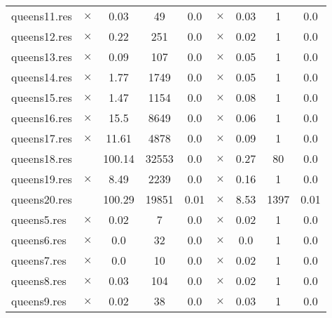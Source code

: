 \documentclass[main.tex]{subfiles}
\begin{document}
\begin{landscape}
\begin{center}
\begin{tabular}{lcccccccc}
queens11.res & $\times$ & 0.03 & 49 & 0.0
 & $\times$ & 0.03 & 1 & 0.0
\\
queens12.res & $\times$ & 0.22 & 251 & 0.0
 & $\times$ & 0.02 & 1 & 0.0
\\
queens13.res & $\times$ & 0.09 & 107 & 0.0
 & $\times$ & 0.05 & 1 & 0.0
\\
queens14.res & $\times$ & 1.77 & 1749 & 0.0
 & $\times$ & 0.05 & 1 & 0.0
\\
queens15.res & $\times$ & 1.47 & 1154 & 0.0
 & $\times$ & 0.08 & 1 & 0.0
\\
queens16.res & $\times$ & 15.5 & 8649 & 0.0
 & $\times$ & 0.06 & 1 & 0.0
\\
queens17.res & $\times$ & 11.61 & 4878 & 0.0
 & $\times$ & 0.09 & 1 & 0.0
\\
queens18.res &  & 100.14 & 32553 & 0.0
 & $\times$ & 0.27 & 80 & 0.0
\\
queens19.res & $\times$ & 8.49 & 2239 & 0.0
 & $\times$ & 0.16 & 1 & 0.0
\\
queens20.res &  & 100.29 & 19851 & 0.01
 & $\times$ & 8.53 & 1397 & 0.01
\\
queens5.res & $\times$ & 0.02 & 7 & 0.0
 & $\times$ & 0.02 & 1 & 0.0
\\
queens6.res & $\times$ & 0.0 & 32 & 0.0
 & $\times$ & 0.0 & 1 & 0.0
\\
queens7.res & $\times$ & 0.0 & 10 & 0.0
 & $\times$ & 0.02 & 1 & 0.0
\\
queens8.res & $\times$ & 0.03 & 104 & 0.0
 & $\times$ & 0.02 & 1 & 0.0
\\
queens9.res & $\times$ & 0.02 & 38 & 0.0
 & $\times$ & 0.03 & 1 & 0.0
\\
\hline\end{tabular}
\end{center}
\end{landscape}
\end{document}
